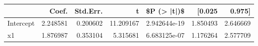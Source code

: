 \begin{tabular}{lrrrrrr}
\toprule
{} &     Coef. &  Std.Err. &          t &   \$P (> |t|)\$ &    [0.025 &    0.975] \\
\midrule
Intercept &  2.248581 &  0.200602 &  11.209167 &  2.942644e-19 &  1.850493 &  2.646669 \\
x1        &  1.876987 &  0.353104 &   5.315681 &  6.683125e-07 &  1.176264 &  2.577709 \\
\bottomrule
\end{tabular}
